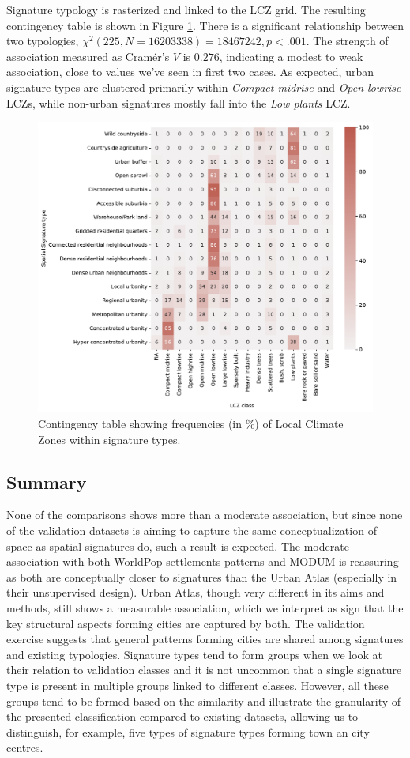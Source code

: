 Signature typology is rasterized and linked to the LCZ grid.
The resulting contingency table is shown in Figure \ref{fig:crosstab_lcz}. There is a
significant relationship between two typologies, $\chi^{2} (225, N = 16203338) = 18467242,
p < .001$. The strength of association measured as Cramér's $V$ is $0.276$, indicating
a modest to weak association, close to values we've seen in first two cases. As expected,
urban signature types are clustered primarily within \textit{Compact midrise} and
\textit{Open lowrise} LCZs, while non-urban signatures mostly fall into the \textit{Low plants} LCZ.

\begin{figure}
    \centering
    \includegraphics[width=.8\linewidth]{fig/crosstab_lcz.pdf}
    \caption{Contingency table showing frequencies (in \%) of Local Climate Zones within signature types.}
    \label{fig:crosstab_lcz}
\end{figure}

\subsection*{Summary}
None of the comparisons shows more than a moderate association, but since none of the
validation datasets is aiming to capture the same conceptualization of space as spatial
signatures do, such a result is expected. The moderate association with both WorldPop
settlements patterns and MODUM is reassuring as both are conceptually closer to
signatures than the Urban Atlas (especially in their unsupervised design). Urban Atlas,
though very different in its aims and methods, still shows a measurable association,
which we interpret as sign that the key structural aspects forming cities are captured by both. The
validation exercise suggests that general patterns forming cities are shared among
signatures and existing typologies. Signature types tend to form groups when we look at
their relation to validation classes and it is not uncommon that a single signature type
is present in multiple groups linked to different classes. However, all these groups
tend to be formed based on the similarity and illustrate the granularity of the
presented classification compared to existing datasets, allowing us to distinguish, for
example, five types of signature types forming town an city centres.

